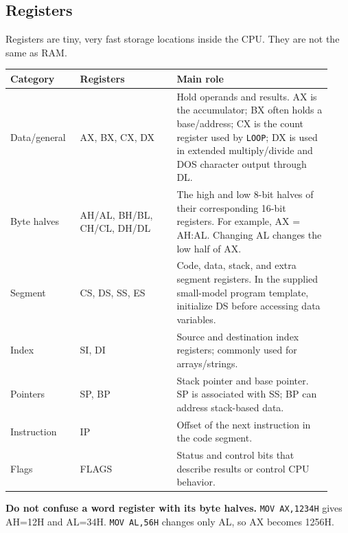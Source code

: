 \documentclass[11pt,a4paper]{article}
\begin{document}
\subsection{Registers}
Registers are tiny, very fast storage locations inside the CPU. They are not the same as RAM.
\begin{longtable}{p{0.2\linewidth}p{0.28\linewidth}p{0.45\linewidth}}
\toprule \textbf{Category} & \textbf{Registers} & \textbf{Main role}\\
\midrule
Data/general & AX, BX, CX, DX & Hold operands and results. AX is the accumulator; BX often holds a base/address; CX is the count register used by \texttt{LOOP}; DX is used in extended multiply/divide and DOS character output through DL.\\
Byte halves & AH/AL, BH/BL, CH/CL, DH/DL & The high and low 8-bit halves of their corresponding 16-bit registers. For example, AX = AH:AL. Changing AL changes the low half of AX.\\
Segment & CS, DS, SS, ES & Code, data, stack, and extra segment registers. In the supplied small-model program template, initialize DS before accessing data variables.\\
Index & SI, DI & Source and destination index registers; commonly used for arrays/strings.\\
Pointers & SP, BP & Stack pointer and base pointer. SP is associated with SS; BP can address stack-based data.\\
Instruction & IP & Offset of the next instruction in the code segment.\\
Flags & FLAGS & Status and control bits that describe results or control CPU behavior.\\
\bottomrule
\end{longtable}
\begin{importantbox}
\textbf{Do not confuse a word register with its byte halves.} \texttt{MOV AX,1234H} gives AH=12H and AL=34H. \texttt{MOV AL,56H} changes only AL, so AX becomes 1256H.
\end{importantbox}
\end{document}
